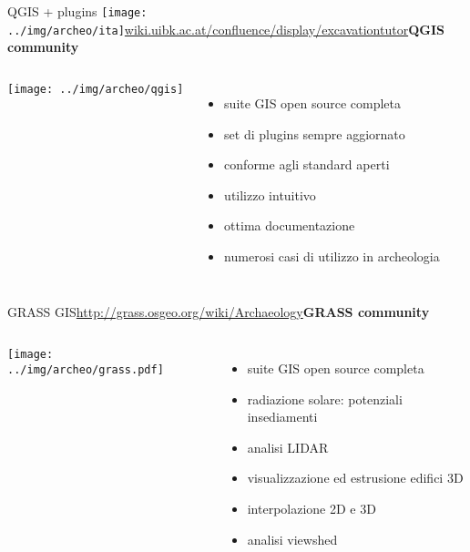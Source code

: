 \documentclass[xcolor=svgnames]{beamer}
\begin{document}

		\begin{frame}{QGIS + plugins\hfill
			\texttt{[image: ../img/archeo/ita]}}{\url{wiki.uibk.ac.at/confluence/display/excavationtutor}\hfill\small{\textbf{QGIS community}}}
			\begin{columns}[c]
					\begin{center}
						\texttt{[image: ../img/archeo/qgis]}
					\end{center}
					\begin{itemize}
						\item suite GIS open source completa
						\item set di plugins sempre aggiornato
						\item conforme agli standard aperti
						\item utilizzo intuitivo
						\item ottima documentazione
						\item numerosi casi di utilizzo in archeologia
					\end{itemize}
			\end{columns}
		\end{frame}


		\begin{frame}{GRASS GIS}{\url{http://grass.osgeo.org/wiki/Archaeology}\hfill\small{\textbf{GRASS community}}}
			\begin{columns}[c]
					\begin{center}
						\texttt{[image: ../img/archeo/grass.pdf]}
					\end{center}
					\begin{itemize}
						\item suite GIS open source completa
						\item radiazione solare: potenziali insediamenti
						\item analisi LIDAR
						\item visualizzazione ed estrusione edifici 3D
						\item interpolazione 2D e 3D
						\item analisi viewshed
					\end{itemize}
			\end{columns}
		\end{frame}
\end{document}
